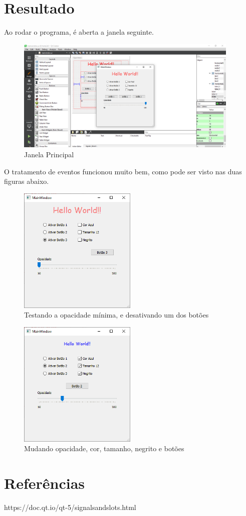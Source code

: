\documentclass[12pt,a4paper]{article}
\begin{document}
\section{Resultado}
Ao rodar o programa, é aberta a janela seguinte.
\begin{figure}[H]
    \centering
    \includegraphics[width=0.95\textwidth]{demo0}
    \caption{Janela Principal}
\end{figure}
O tratamento de eventos funcionou muito bem, como pode ser visto nas duas figuras abaixo.
\begin{figure}[H]
    \centering
    \includegraphics[width=0.5\textwidth]{demo1}
    \caption{Testando a opacidade mínima, e desativando um dos botões}
\end{figure}
\begin{figure}[H]
    \centering
    \includegraphics[width=0.5\textwidth]{demo2.png}
    \caption{Mudando opacidade, cor, tamanho, negrito e botões}
\end{figure}
\section{Referências}
https://doc.qt.io/qt-5/signalsandslots.html
\end{document}
